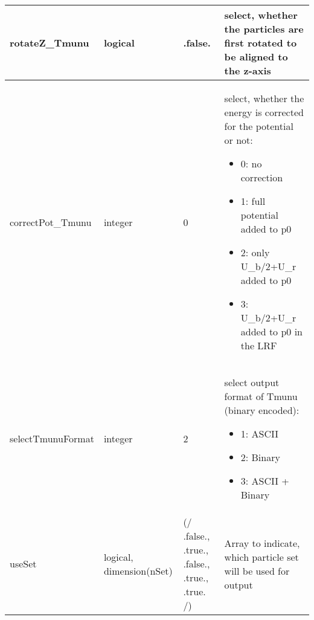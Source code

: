 \documentclass{article}
\begin{document}
\begin{longtable}{llll}
\midrule
rotateZ\_Tmunu & \begin{minipage}[t]{2cm}logical\end{minipage} & \begin{minipage}[t]{2cm}.false.\end{minipage} & \begin{minipage}[t]{12cm}select, whether the particles are first rotated to be aligned to the z-axis\end{minipage}\\*
\midrule
correctPot\_Tmunu & \begin{minipage}[t]{2cm}integer\end{minipage} & \begin{minipage}[t]{2cm}0\end{minipage} & \begin{minipage}[t]{12cm}select, whether the energy is corrected for the potential or not:\begin{itemize}\leftmargin0em\itemindent0pt\item 0: no correction\item 1: full potential added to p0\item 2: only U\_b/2+U\_r added to p0\item 3: U\_b/2+U\_r added to p0 in the LRF\end{itemize}\end{minipage}\\*
\midrule
selectTmunuFormat & \begin{minipage}[t]{2cm}integer\end{minipage} & \begin{minipage}[t]{2cm}2\end{minipage} & \begin{minipage}[t]{12cm}select output format of Tmunu (binary encoded):\begin{itemize}\leftmargin0em\itemindent0pt\item 1: ASCII\item 2: Binary\item 3: ASCII + Binary\end{itemize}\end{minipage}\\*
\midrule
useSet & \begin{minipage}[t]{2cm}logical, dimension(nSet)\end{minipage} & \begin{minipage}[t]{2cm}(/ .false., .true., .false., .true., .true. /)\end{minipage} & \begin{minipage}[t]{12cm}Array to indicate, which particle set will be used for output\end{minipage}\\*

\end{longtable}
\end{document}
